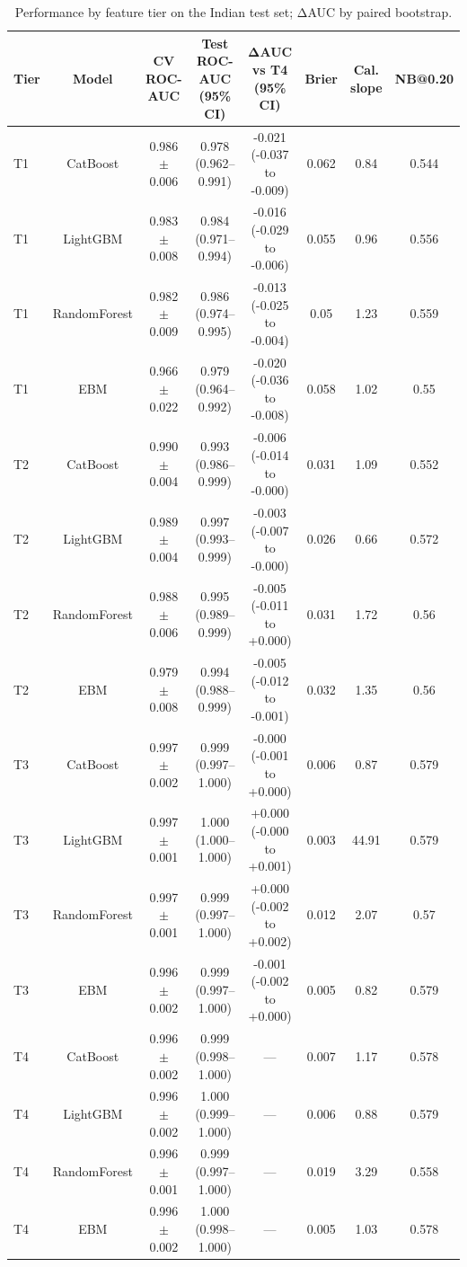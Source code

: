 \begin{table}[t]
\centering
\small
\caption{Performance by feature tier on the Indian test set; ΔAUC by paired bootstrap.}
\label{tab:tiers}
\begin{tabular}{lccccccc}
\toprule
Tier & Model & CV ROC-AUC & Test ROC-AUC (95\% CI) & ΔAUC vs T4 (95\% CI) & Brier & Cal. slope & NB@0.20 \\
\midrule
T1 & CatBoost & 0.986 $\pm$ 0.006 & 0.978 (0.962--0.991) & -0.021 (-0.037 to -0.009) & 0.062 & 0.84 & 0.544 \\
T1 & LightGBM & 0.983 $\pm$ 0.008 & 0.984 (0.971--0.994) & -0.016 (-0.029 to -0.006) & 0.055 & 0.96 & 0.556 \\
T1 & RandomForest & 0.982 $\pm$ 0.009 & 0.986 (0.974--0.995) & -0.013 (-0.025 to -0.004) & 0.05 & 1.23 & 0.559 \\
T1 & EBM & 0.966 $\pm$ 0.022 & 0.979 (0.964--0.992) & -0.020 (-0.036 to -0.008) & 0.058 & 1.02 & 0.55 \\
T2 & CatBoost & 0.990 $\pm$ 0.004 & 0.993 (0.986--0.999) & -0.006 (-0.014 to -0.000) & 0.031 & 1.09 & 0.552 \\
T2 & LightGBM & 0.989 $\pm$ 0.004 & 0.997 (0.993--0.999) & -0.003 (-0.007 to -0.000) & 0.026 & 0.66 & 0.572 \\
T2 & RandomForest & 0.988 $\pm$ 0.006 & 0.995 (0.989--0.999) & -0.005 (-0.011 to +0.000) & 0.031 & 1.72 & 0.56 \\
T2 & EBM & 0.979 $\pm$ 0.008 & 0.994 (0.988--0.999) & -0.005 (-0.012 to -0.001) & 0.032 & 1.35 & 0.56 \\
T3 & CatBoost & 0.997 $\pm$ 0.002 & 0.999 (0.997--1.000) & -0.000 (-0.001 to +0.000) & 0.006 & 0.87 & 0.579 \\
T3 & LightGBM & 0.997 $\pm$ 0.001 & 1.000 (1.000--1.000) & +0.000 (-0.000 to +0.001) & 0.003 & 44.91 & 0.579 \\
T3 & RandomForest & 0.997 $\pm$ 0.001 & 0.999 (0.997--1.000) & +0.000 (-0.002 to +0.002) & 0.012 & 2.07 & 0.57 \\
T3 & EBM & 0.996 $\pm$ 0.002 & 0.999 (0.997--1.000) & -0.001 (-0.002 to +0.000) & 0.005 & 0.82 & 0.579 \\
T4 & CatBoost & 0.996 $\pm$ 0.002 & 0.999 (0.998--1.000) & — & 0.007 & 1.17 & 0.578 \\
T4 & LightGBM & 0.996 $\pm$ 0.002 & 1.000 (0.999--1.000) & — & 0.006 & 0.88 & 0.579 \\
T4 & RandomForest & 0.996 $\pm$ 0.001 & 0.999 (0.997--1.000) & — & 0.019 & 3.29 & 0.558 \\
T4 & EBM & 0.996 $\pm$ 0.002 & 1.000 (0.998--1.000) & — & 0.005 & 1.03 & 0.578 \\
\bottomrule
\end{tabular}
\end{table}
